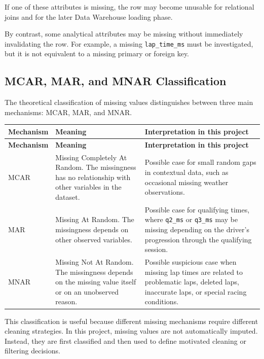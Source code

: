 \documentclass[a4paper,11pt]{article}
\begin{document}
	If one of these attributes is missing, the row may become unusable for relational joins
	and for the later Data Warehouse loading phase.
	
	By contrast, some analytical attributes may be missing without immediately invalidating
	the row. For example, a missing \texttt{lap\_time\_ms} must be investigated, but it is not
	equivalent to a missing primary or foreign key.
	
	\subsection{MCAR, MAR, and MNAR Classification}
	
	The theoretical classification of missing values distinguishes between three main
	mechanisms: MCAR, MAR, and MNAR.
	
	\begin{longtable}{p{3cm}p{6cm}p{5.5cm}}
		\toprule
		\textbf{Mechanism} & \textbf{Meaning} & \textbf{Interpretation in this project} \\
		\midrule
		\endfirsthead
		
		\toprule
		\textbf{Mechanism} & \textbf{Meaning} & \textbf{Interpretation in this project} \\
		\midrule
		\endhead
		
		MCAR &
		Missing Completely At Random. The missingness has no relationship with other
		variables in the dataset. &
		Possible case for small random gaps in contextual data, such as occasional missing
		weather observations. \\
		\midrule
		
		MAR &
		Missing At Random. The missingness depends on other observed variables. &
		Possible case for qualifying times, where \texttt{q2\_ms} or \texttt{q3\_ms} may be missing
		depending on the driver's progression through the qualifying session. \\
		\midrule
		
		MNAR &
		Missing Not At Random. The missingness depends on the missing value itself or on an
		unobserved reason. &
		Possible suspicious case when missing lap times are related to problematic laps, deleted
		laps, inaccurate laps, or special racing conditions. \\
		\bottomrule
	\end{longtable}
	
	This classification is useful because different missing mechanisms require different
	cleaning strategies. In this project, missing values are not automatically imputed. Instead,
	they are first classified and then used to define motivated cleaning or filtering decisions.
	
\end{document}
